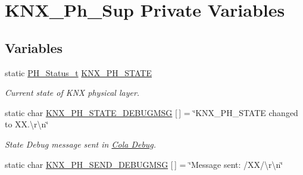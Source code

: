 \hypertarget{group___k_n_x___p_h___sup___private___variables}{}\section{K\+N\+X\+\_\+\+Ph\+\_\+\+Sup Private Variables}
\label{group___k_n_x___p_h___sup___private___variables}
\subsection*{Variables}
\begin{DoxyCompactItemize}
\item 
static \hyperlink{group___k_n_x___p_h___sup___exported___types_ga5b665a94bef912fbfbea7cc949ed0e49}{P\+H\+\_\+\+Status\+\_\+t} \hyperlink{group___k_n_x___p_h___sup___private___variables_gaed45956ede9586539568adc9994c6dfb}{K\+N\+X\+\_\+\+P\+H\+\_\+\+S\+T\+A\+TE}\hypertarget{group___k_n_x___p_h___sup___private___variables_gaed45956ede9586539568adc9994c6dfb}{}\label{group___k_n_x___p_h___sup___private___variables_gaed45956ede9586539568adc9994c6dfb}

\begin{DoxyCompactList}\small\item\em Current state of K\+NX physical layer. \end{DoxyCompactList}\item 
static char \hyperlink{group___k_n_x___p_h___sup___private___variables_ga00420d0a4e21ce2fc7f88cee0f6000b0}{K\+N\+X\+\_\+\+P\+H\+\_\+\+S\+T\+A\+T\+E\+\_\+\+D\+E\+B\+U\+G\+M\+SG} \mbox{[}$\,$\mbox{]} = \char`\"{}K\+N\+X\+\_\+\+P\+H\+\_\+\+S\+T\+A\+TE changed to X\+X.\textbackslash{}r\textbackslash{}n\char`\"{}\hypertarget{group___k_n_x___p_h___sup___private___variables_ga00420d0a4e21ce2fc7f88cee0f6000b0}{}\label{group___k_n_x___p_h___sup___private___variables_ga00420d0a4e21ce2fc7f88cee0f6000b0}

\begin{DoxyCompactList}\small\item\em State Debug message sent in \hyperlink{group___cola___debug}{Cola Debug}. \end{DoxyCompactList}\item 
static char \hyperlink{group___k_n_x___p_h___sup___private___variables_gabe6619ffb844e6d6e976f3706e829cd0}{K\+N\+X\+\_\+\+P\+H\+\_\+\+S\+E\+N\+D\+\_\+\+D\+E\+B\+U\+G\+M\+SG} \mbox{[}$\,$\mbox{]} = \char`\"{}Message sent\+: /XX/\textbackslash{}r\textbackslash{}n\char`\"{}\hypertarget{group___k_n_x___p_h___sup___private___variables_gabe6619ffb844e6d6e976f3706e829cd0}{}\label{group___k_n_x___p_h___sup___private___variables_gabe6619ffb844e6d6e976f3706e829cd0}


\end{DoxyCompactItemize}
